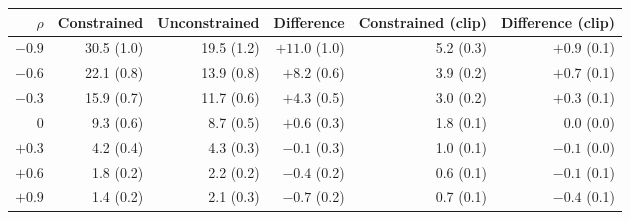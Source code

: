 \begin{tabular}{rrrrrr}
\toprule
$\rho$ & Constrained & Unconstrained & Difference & Constrained (clip) & Difference (clip) \\
\midrule
$-0.9$ & 30.5 (1.0) & 19.5 (1.2) & $+11.0$ (1.0) & 5.2 (0.3) & $+0.9$ (0.1) \\
$-0.6$ & 22.1 (0.8) & 13.9 (0.8) & $+8.2$ (0.6) & 3.9 (0.2) & $+0.7$ (0.1) \\
$-0.3$ & 15.9 (0.7) & 11.7 (0.6) & $+4.3$ (0.5) & 3.0 (0.2) & $+0.3$ (0.1) \\
0 & 9.3 (0.6) & 8.7 (0.5) & $+0.6$ (0.3) & 1.8 (0.1) & $0.0$ (0.0) \\
$+0.3$ & 4.2 (0.4) & 4.3 (0.3) & $-0.1$ (0.3) & 1.0 (0.1) & $-0.1$ (0.0) \\
$+0.6$ & 1.8 (0.2) & 2.2 (0.2) & $-0.4$ (0.2) & 0.6 (0.1) & $-0.1$ (0.1) \\
$+0.9$ & 1.4 (0.2) & 2.1 (0.3) & $-0.7$ (0.2) & 0.7 (0.1) & $-0.4$ (0.1) \\
\bottomrule
\end{tabular}
